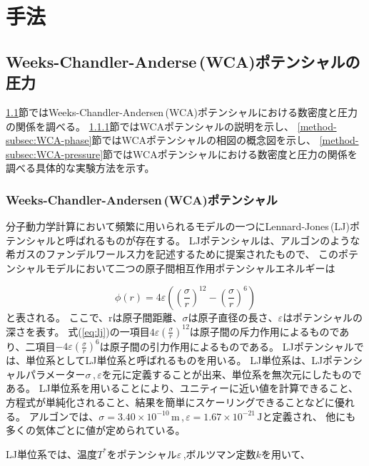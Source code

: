 \documentclass[titlepage]{jsreport}
\begin{document}
\chapter{手法} \label{chap:method}
\section{Weeks-Chandler-Anderse\,(WCA)ポテンシャルの圧力}\label{method-sec:WCA-press}
\ref{method-sec:WCA-press}節ではWeeks-Chandler-Andersen\,(WCA)ポテンシャルにおける数密度と圧力の関係を調べる。
\ref{method-subsec:WCA}節ではWCAポテンシャルの説明を示し、
\ref{method-subsec:WCA-phase}節ではWCAポテンシャルの相図の概念図を示し、
\ref{method-subsec:WCA-pressure}節ではWCAポテンシャルにおける数密度と圧力の関係を調べる具体的な実験方法を示す。

\subsection{Weeks-Chandler-Andersen\,(WCA)ポテンシャル}\label{method-subsec:WCA}
分子動力学計算において頻繁に用いられるモデルの一つにLennard-Jones\,(LJ)ポテンシャルと呼ばれるものが存在する。
LJポテンシャルは、アルゴンのような希ガスのファンデルワールス力を記述するために提案\cite{Lennard_Jones_1931}されたもので、
このポテンシャルモデルにおいて二つの原子間相互作用ポテンシャルエネルギーは

\large
\begin{equation}
\phi(r)=4{\varepsilon}\left(\left(\frac{\sigma}{r}\right)^{12}-\left(\frac{\sigma}{r}\right)^6\right)\label{eq:lj}
\end{equation}
\normalsize
と表される。
ここで、rは原子間距離、${\sigma}$は原子直径の長さ、${\varepsilon}$はポテンシャルの深さを表す。
式(\ref{eq:lj})の一項目$4{\varepsilon}(\frac{\sigma}{r})^{12}$は原子間の斥力作用によるものであり、二項目$-4\varepsilon(\frac{\sigma}{r})^{6}$は原子間の引力作用によるものである。
LJポテンシャルでは、単位系としてLJ単位系と呼ばれるものを用いる。
LJ単位系は、LJポテンシャルパラメーター${\sigma}$\,,\,${\varepsilon}$を元に定義することが出来、単位系を無次元にしたものである。
LJ単位系を用いることにより、ユニティーに近い値を計算できること、方程式が単純化されること、結果を簡単にスケーリングできることなどに優れる。
アルゴンでは、${\sigma}=3.40×10^{-10}\,\mathrm{m}$\,,\,${\varepsilon}=1.67×10^{-21}\,\mathrm{J}$と定義\cite{argon-parameters}され、
他にも多くの気体ごとに値が定められている\cite{graphane-parameters}\cite{many-parameters}。

LJ単位系では、温度$T^*$をポテンシャル$\varepsilon$\,,ボルツマン定数$k$を用いて、
\end{document}
